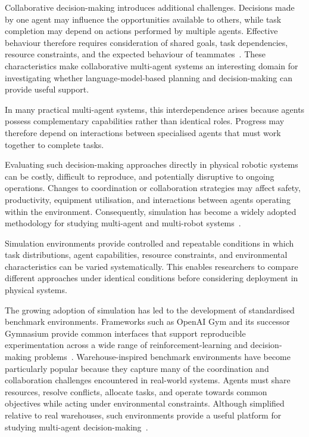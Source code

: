 Collaborative decision-making introduces additional challenges. Decisions made by one agent may influence the opportunities available to others, while task completion may depend on actions performed by multiple agents. Effective behaviour therefore requires consideration of shared goals, task dependencies, resource constraints, and the expected behaviour of teammates~\cite{karam2026collaborationmrs}. These characteristics make collaborative multi-agent systems an interesting domain for investigating whether language-model-based planning and decision-making can provide useful support.

In many practical multi-agent systems, this interdependence arises because agents possess complementary capabilities rather than identical roles. Progress may therefore depend on interactions between specialised agents that must work together to complete tasks.

Evaluating such decision-making approaches directly in physical robotic systems can be costly, difficult to reproduce, and potentially disruptive to ongoing operations. Changes to coordination or collaboration strategies may affect safety, productivity, equipment utilisation, and interactions between agents operating within the environment. Consequently, simulation has become a widely adopted methodology for studying multi-agent and multi-robot systems~\cite{papoudakis2021benchmarking,krnjaic2024warehouse}.


Simulation environments provide controlled and repeatable conditions in which task distributions, agent capabilities, resource constraints, and environmental characteristics can be varied systematically. This enables researchers to compare different approaches under identical conditions before considering deployment in physical systems.


The growing adoption of simulation has led to the development of standardised benchmark environments. Frameworks such as OpenAI Gym and its successor Gymnasium provide common interfaces that support reproducible experimentation across a wide range of reinforcement-learning and decision-making problems~\cite{brockman2016gym,towers2024gymnasium}.
Warehouse-inspired benchmark environments have become particularly popular because they capture many of the coordination and collaboration challenges encountered in real-world systems. Agents must share resources, resolve conflicts, allocate tasks, and operate towards common objectives while acting under environmental constraints. Although simplified relative to real warehouses, such environments provide a useful platform for studying multi-agent decision-making~\cite{krnjaic2024warehouse}.


